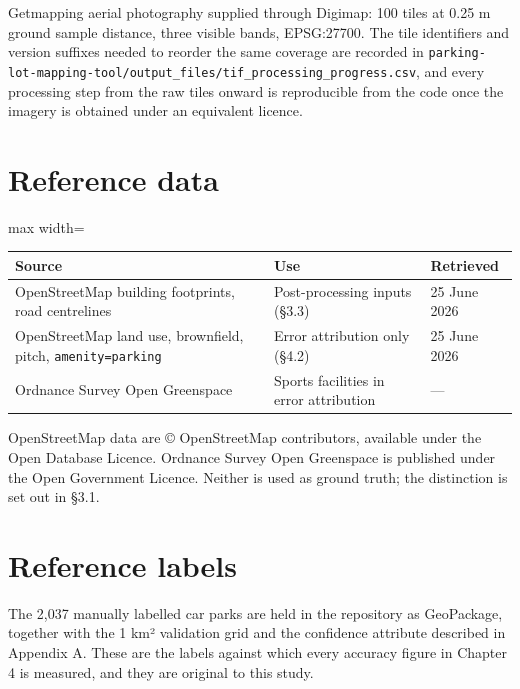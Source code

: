 Getmapping aerial photography supplied through Digimap: 100 tiles at 0.25 m ground sample distance, three visible bands, EPSG:27700. The tile identifiers and version suffixes needed to reorder the same coverage are recorded in \texttt{parking-\allowbreak{}lot-\allowbreak{}mapping-\allowbreak{}tool/\allowbreak{}output\_\allowbreak{}files/\allowbreak{}tif\_\allowbreak{}processing\_\allowbreak{}progress.\allowbreak{}csv}, and every processing step from the raw tiles onward is reproducible from the code once the imagery is obtained under an equivalent licence.

\hypertarget{reference-data}{%
\section{Reference data}\label{reference-data}}

\begin{table}[htbp]
\centering
\begin{adjustbox}{max width=\textwidth}
\begin{tabular}{@{}lll@{}}
\toprule
Source & Use & Retrieved \\
\midrule
OpenStreetMap building footprints, road centrelines & Post-processing inputs (§3.3) & 25 June 2026 \\
OpenStreetMap land use, brownfield, pitch, \texttt{amenity=parking} & Error attribution only (§4.2) & 25 June 2026 \\
Ordnance Survey Open Greenspace & Sports facilities in error attribution & --- \\
\bottomrule
\end{tabular}
\end{adjustbox}
\end{table}
\restoreparskip

OpenStreetMap data are © OpenStreetMap contributors, available under the Open Database Licence. Ordnance Survey Open Greenspace is published under the Open Government Licence. Neither is used as ground truth; the distinction is set out in §3.1.

\hypertarget{reference-labels}{%
\section{Reference labels}\label{reference-labels}}

The 2,037 manually labelled car parks are held in the repository as GeoPackage, together with the 1 km² validation grid and the confidence attribute described in Appendix A. These are the labels against which every accuracy figure in Chapter 4 is measured, and they are original to this study.

